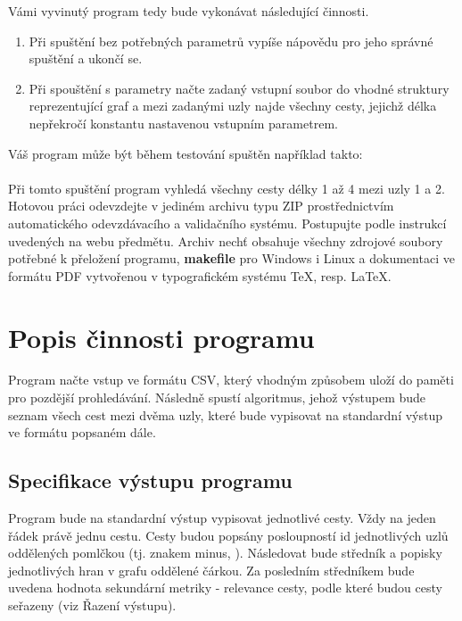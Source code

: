 Vámi vyvinutý program tedy bude vykonávat následující činnosti.
\begin{enumerate}
\item Při spuštění bez potřebných parametrů vypíše nápovědu pro jeho správné spuštění a ukončí se.
\item Při spouštění s parametry načte zadaný vstupní soubor do vhodné struktury reprezentující graf a mezi zadanými uzly najde všechny cesty, jejichž délka nepřekročí konstantu nastavenou vstupním parametrem.
\end{enumerate}

Váš program může být během testování spuštěn například takto:\\

\\

Při tomto spuštění program vyhledá všechny cesty délky 1 až 4 mezi uzly 1 a 2.\\

Hotovou práci odevzdejte v jediném archivu typu ZIP prostřednictvím automatického odevzdávacího a validačního systému. Postupujte podle instrukcí uvedených na webu předmětu. Archiv nechť obsahuje všechny zdrojové soubory potřebné k přeložení programu, \textbf{makefile} pro Windows i Linux a dokumentaci ve formátu PDF vytvořenou v typografickém systému \TeX, resp. \LaTeX.

\section{Popis činnosti programu}
Program načte vstup ve formátu CSV, který vhodným způsobem uloží do paměti pro pozdější prohledávání. Následně spustí algoritmus, jehož výstupem bude seznam všech cest mezi dvěma uzly, které bude vypisovat na standardní výstup ve formátu popsaném dále.

\subsection{Specifikace výstupu programu}
Program bude na standardní výstup vypisovat jednotlivé cesty. Vždy na jeden řádek právě jednu cestu. Cesty budou popsány posloupností id jednotlivých uzlů oddělených pomlčkou (tj. znakem minus,  \uv{\textbf{-}}). Následovat bude středník a popisky jednotlivých hran v grafu oddělené čárkou. Za posledním středníkem bude uvedena hodnota sekundární metriky - relevance cesty, podle které budou cesty seřazeny (viz Řazení výstupu).\\

